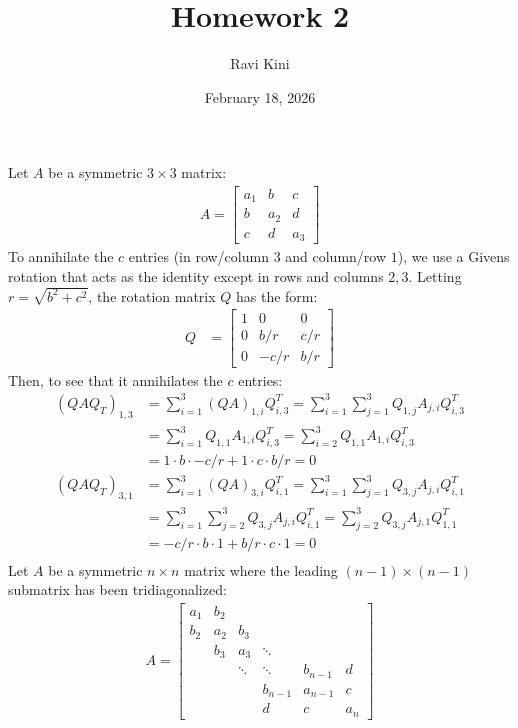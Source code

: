 \documentclass{article}
\title{Homework 2}
\author{Ravi Kini}
\date{February 18, 2026}
\begin{document}
\maketitle

\problem{}
Let $A$ be a symmetric $3 \times 3$ matrix:
\begin{align*}
    A = \begin{bmatrix}
        a_1 & b & c \\ b & a_2 & d \\ c & d & a_3
    \end{bmatrix}
\end{align*}
To annihilate the $c$ entries (in row/column $3$ and column/row $1$), we use a Givens rotation that acts as the identity except in rows and columns $2, 3$. Letting $r = \sqrt{b^2 + c^2}$, the rotation matrix $Q$ has the form:
\begin{align*}
    Q & = \begin{bmatrix}
        1 & 0 & 0 \\ 0 & b/r & c/r \\ 0 & -c/r & b/r
    \end{bmatrix}
\end{align*}
Then, to see that it annihilates the $c$ entries:
\begin{align*}
    (QAQ_T)_{1,3} & = \sum_{i=1}^3 (QA)_{1,i}Q^T_{i,3} = \sum_{i=1}^3 \sum_{j=1}^3 Q_{1,j}A_{j,i}Q^T_{i,3} \\
    & = \sum_{i=1}^3 Q_{1,1}A_{1,i}Q^T_{i,3} = \sum_{i=2}^3 Q_{1,1}A_{1,i}Q^T_{i,3} \\
    & = 1 \cdot b \cdot -c/r + 1 \cdot c \cdot b/r = 0 \\
    (QAQ_T)_{3,1} & = \sum_{i=1}^3 (QA)_{3,i}Q^T_{i,1} = \sum_{i=1}^3 \sum_{j=1}^3 Q_{3,j}A_{j,i}Q^T_{i,1} \\
    & = \sum_{i=1}^3 \sum_{j=2}^3 Q_{3,j}A_{j,i}Q^T_{i,1} = \sum_{j=2}^3 Q_{3,j}A_{j,1}Q^T_{1,1} \\
    & = -c/r \cdot b \cdot 1 + b/r \cdot c \cdot 1 = 0 \\
\end{align*}
Let $A$ be a symmetric $n \times n$ matrix where the leading $(n - 1) \times (n - 1)$ submatrix has been tridiagonalized:
\begin{align*}
    A = \begin{bmatrix}
        a_1 & b_2 & & & & \\
        b_2 & a_2 & b_3 & & & \\
        & b_3 & a_3 & \ddots & & \\
        & & \ddots & \ddots & b_{n-1} & d \\
        & & & b_{n-1} & a_{n-1} & c \\
        & & & d & c & a_n
    \end{bmatrix}
\end{align*}
\end{document}
